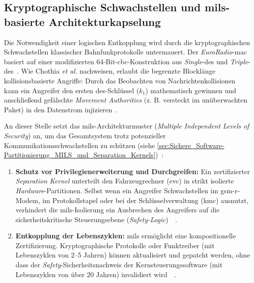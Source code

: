 \documentclass[runningheads]{res/llncs}
\begin{document}
\subsection{\texorpdfstring{Kryptographische Schwachstellen und \gls{mils}-basierte Architekturkapselung}{Kryptographische Schwachstellen und MILS-basierte Architekturkapselung}}
\label{sec:Kryptographische_Schwachstellen_und_MILS-basierte_Architekturkapselung}
Die Notwendigkeit einer logischen Entkopplung wird durch die kryptographischen Schwachstellen klassischer Bahnfunkprotokolle untermauert. Der \textit{EuroRadio}-\gls{mac} basiert auf einer modifizierten 64-Bit-\gls{cbc}-Konstruktion aus \textit{Single}-\gls{des} und \textit{Triple}-\gls{des}~\parencite[S. 751]{chothiaAttack2017}. Wie Chothia \textit{et al.} nachweisen, erlaubt die begrenzte Blocklänge kollisionsbasierte Angriffe: Durch das Beobachten von Nachrichtenkollisionen kann ein Angreifer den ersten \gls{des}-Schlüssel ($k_1$) mathematisch gewinnen und anschließend gefälschte \textit{Movement Authorities} (z. B. versteckt im unüberwachten Paket) in den Datenstrom injizieren~\parencite[S. 751--754]{chothiaAttack2017}.

An dieser Stelle setzt das \gls{mils}-Architekturmuster (\textit{Multiple Independent Levels of Security}) an, um das Gesamtsystem trotz potenzieller Kommunikationsschwachstellen zu schützen (siehe \autoref{sec:Sichere_Software-Partitionierung_MILS_und_Separation_Kernels})~\parencite[S. 31--32]{schulzIntegration2019}:

\begin{enumerate}
    \item \textbf{Schutz vor Privilegienerweiterung und Durchgreifen:} Ein zertifizierter \textit{Separation Kernel} unterteilt den Fahrzeugrechner (\gls{evc}) in strikt isolierte \textit{Hardware}-Partitionen. Selbst wenn ein Angreifer Schwachstellen im \gls{gsm-r}-Modem, im Protokollstapel oder bei der Schlüsselverwaltung (\gls{kmc}) ausnutzt, verhindert die \gls{mils}-Isolierung ein Ausbrechen des Angreifers auf die sicherheitskritische Steuerungsebene (\textit{Safety-Logic})~\parencite[S. 32--34]{schulzIntegration2019}~\parencite[S. 80--81]{tverdyshevCertMILS2019}.
    \item \textbf{Entkopplung der Lebenszyklen:} \gls{mils} ermöglicht eine kompositionelle Zertifizierung. Kryptographische Protokolle oder Funktreiber (mit Lebenszyklen von 2--5 Jahren) können aktualisiert und gepatcht werden, ohne dass der \textit{Safety}-Sicherheitsnachweis der Kernsteuerungssoftware (mit Lebenszyklen von über 20 Jahren) invalidiert wird~\parencite[S. 31, 35]{schulzIntegration2019}~\parencite[S. 83]{tverdyshevCertMILS2019}.
\end{enumerate}
\end{document}
